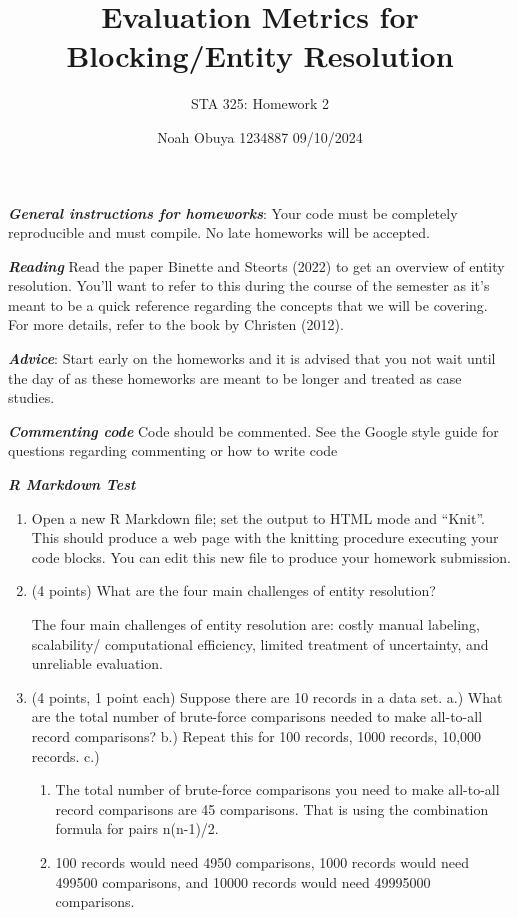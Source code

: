 \documentclass[
]{article}
\title{Evaluation Metrics for Blocking/Entity Resolution}
\author{STA 325: Homework 2}
\date{Noah Obuya \textbar{} 1234887 \textbar{} 09/10/2024}
\begin{document}
\maketitle

\textbf{\emph{General instructions for homeworks}}: Your code must be
completely reproducible and must compile. No late homeworks will be
accepted.

\textbf{\emph{Reading}} Read the paper Binette and Steorts (2022) to get
an overview of entity resolution. You'll want to refer to this during
the course of the semester as it's meant to be a quick reference
regarding the concepts that we will be covering. For more details, refer
to the book by Christen (2012).

\textbf{\emph{Advice}}: Start early on the homeworks and it is advised
that you not wait until the day of as these homeworks are meant to be
longer and treated as case studies.

\textbf{\emph{Commenting code}} Code should be commented. See the Google
style guide for questions regarding commenting or how to write code

\textbf{\emph{R Markdown Test}}

\begin{enumerate}
\def\labelenumi{\arabic{enumi}.}
\setcounter{enumi}{-1}
\item
  Open a new R Markdown file; set the output to HTML mode and ``Knit''.
  This should produce a web page with the knitting procedure executing
  your code blocks. You can edit this new file to produce your homework
  submission.
\item
  (4 points) What are the four main challenges of entity resolution?

  The four main challenges of entity resolution are: costly manual
  labeling, scalability/ computational efficiency, limited treatment of
  uncertainty, and unreliable evaluation.
\item
  (4 points, 1 point each) Suppose there are 10 records in a data set.
  a.) What are the total number of brute-force comparisons needed to
  make all-to-all record comparisons? b.) Repeat this for 100 records,
  1000 records, 10,000 records. c.)

  \begin{enumerate}
  \def\labelenumii{\alph{enumii})}
  \item
    The total number of brute-force comparisons you need to make
    all-to-all record comparisons are 45 comparisons. That is using the
    combination formula for pairs n(n-1)/2.
  \item
    100 records would need 4950 comparisons, 1000 records would need
    499500 comparisons, and 10000 records would need 49995000
    comparisons.
  \end{enumerate}
\end{enumerate}
\end{document}
